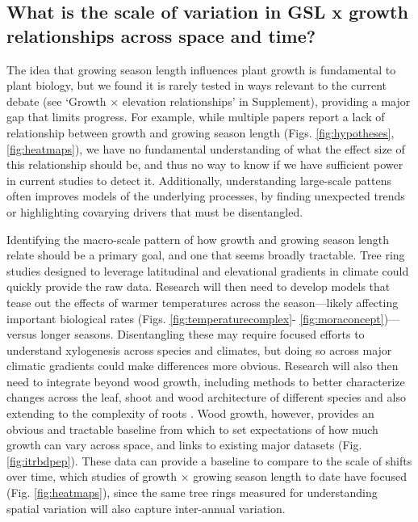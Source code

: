 \documentclass[11pt]{article}
\begin{document}
\subsection*{What is the scale of variation in GSL x growth relationships across space and time?}

The idea that growing season length influences plant growth is fundamental to plant biology, but we found it is rarely tested in ways relevant to the current debate (see `Growth $\times$ elevation relationships' in Supplement), providing a major gap that limits progress. For example, while multiple papers report a lack of relationship between growth and growing season length (Figs. \ref{fig:hypotheses}, \ref{fig:heatmaps}), we have no fundamental understanding of what the effect size of this relationship should be, and thus no way to know if we have sufficient power in current studies to detect it. Additionally, understanding large-scale pattens often improves models of the underlying processes, by finding unexpected trends or highlighting covarying drivers that must be disentangled. %

Identifying the macro-scale pattern of how growth and growing season length relate should be a primary goal, and one that seems broadly tractable. Tree ring studies designed to leverage latitudinal and elevational gradients in climate could quickly provide the raw data. Research will then need to develop models that tease out the effects of warmer temperatures across the season---likely affecting important biological rates  (Figs. \ref{fig:temperaturecomplex}- \ref{fig:moraconcept})---versus longer seasons. Disentangling these may require focused efforts to understand xylogenesis across species and climates, but doing so across major climatic gradients could make differences more obvious. Research will also then need to integrate beyond wood growth, including methods to better characterize changes across the leaf, shoot and wood architecture of different species \citep[e.g.,][]{puletti2020lidar,sillett2024ground} and also extending to the complexity of roots \citep{mckown2016impacts,radville2016}. Wood growth, however, provides an obvious and tractable baseline from which to set expectations of how much growth can vary across space, and links to existing major datasets (Fig. \ref{fig:itrbdpep}). These data can provide a baseline to compare to the scale of shifts over time, which studies of growth $\times$ growing season length to date have focused (Fig. \ref{fig:heatmaps}), since the same tree rings measured for understanding spatial variation will also capture inter-annual variation. 
\end{document}
